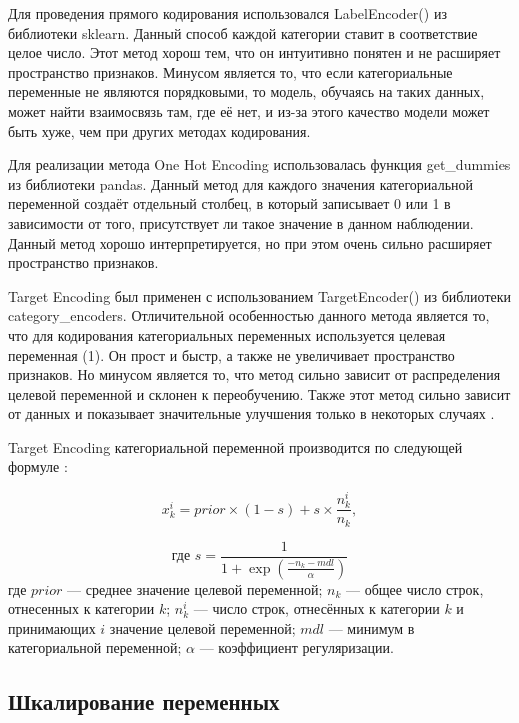 \documentclass[14pt]{mmcs_article}
\begin{document}
Для проведения прямого кодирования использовался LabelEncoder() из библиотеки sklearn. Данный способ каждой категории ставит в соответствие целое число. Этот метод хорош тем, что он интуитивно понятен и не расширяет пространство признаков. Минусом является то, что если категориальные переменные не являются порядковыми, то модель, обучаясь на таких данных, может найти взаимосвязь там, где её нет, и из-за этого качество модели может быть хуже, чем при других методах кодирования.

Для реализации метода One Hot Encoding использовалась функция get\_dummies из библиотеки pandas. Данный метод для каждого значения категориальной переменной создаёт отдельный столбец, в который записывает 0 или 1 в зависимости от того, присутствует ли такое значение в данном наблюдении. Данный метод хорошо интерпретируется, но при этом очень сильно расширяет пространство признаков. 

Target Encoding был применен с использованием TargetEncoder() из библиотеки category\_encoders. Отличительной особенностью данного метода является то, что для кодирования категориальных переменных используется целевая переменная (1). Он прост и быстр, а также не увеличивает пространство признаков. Но минусом является то, что метод сильно зависит от распределения целевой переменной и склонен к переобучению. Также этот метод сильно зависит от данных и показывает значительные улучшения только в некоторых случаях \cite{lib:encoding}.

Target Encoding категориальной переменной производится по следующей формуле \cite{lib:tarencode}:

\begin{equation}\label{eq:tar}
	x^i_k=prior \times (1-s)+s \times \frac{n^i_k}{n_k},
\end{equation}

\begin{equation*}
	\text{где } s = \frac{1}{1 + \exp \left( \frac{-n_k-mdl}{\alpha} \right)}
\end{equation*}
где $prior$ --- среднее значение целевой переменной;  $n_k$ --- общее число строк, отнесенных к категории $k$; $n^i_k$ --- число строк, отнесённых к категории $k$ и принимающих $i$ значение целевой переменной; $mdl$ --- минимум в категориальной переменной; $\alpha$ --- коэффициент регуляризации.


\subsection{Шкалирование переменных}
\end{document}

